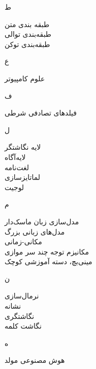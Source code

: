\begin{center}
ط
\end{center}
طبقه بندی متن	 \dotfill 	 {} \\ 
طبقه‌بندی توالی	 \dotfill 	 {} \\ 
طبقه‌بندی توکن	 \dotfill 	 {} \\ 
\begin{center}
ع
\end{center}
علوم کامپیوتر	 \dotfill 	 {} \\ 
\begin{center}
ف
\end{center}
فیلدهای تصادفی شرطی	 \dotfill 	 {} \\ 
\begin{center}
ل
\end{center}
لایه نگاشتگر	 \dotfill 	 {} \\ 
لایه‌آگاه	 \dotfill 	 {} \\ 
لغت‌نامه	 \dotfill 	 {} \\ 
لماتایز‌سازی	 \dotfill 	 {} \\ 
لوجیت	 \dotfill 	 {} \\ 
\begin{center}
م
\end{center}
مدل‌سازی زبان ماسک‌دار	 \dotfill 	 {} \\ 
مدل‌های زبانی بزرگ	 \dotfill 	 {} \\ 
مکانی-زمانی	 \dotfill 	 {} \\ 
مکانیزم توجه چند سر موازی	 \dotfill 	 {} \\ 
مینی‌بچ، دسته آموزشی کوچک	 \dotfill 	 {} \\ 
\begin{center}
ن
\end{center}
نرمال‌سازی	 \dotfill 	 {} \\ 
نشانه	 \dotfill 	 {} \\ 
نگاشتگری	 \dotfill 	 {} \\ 
نگاشت‌ کلمه	 \dotfill 	 {} \\ 
\begin{center}
ه
\end{center}
هوش مصنوعی مولد	 \dotfill 	 {} \\ 
